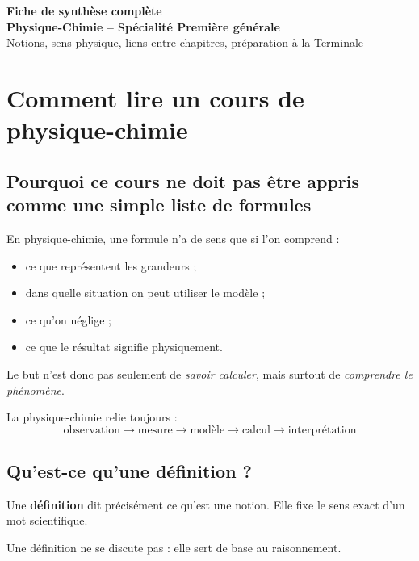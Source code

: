 \documentclass[11pt,a4paper]{article}
\begin{document}
\begin{center}
    {\LARGE \textbf{Fiche de synthèse complète}}\\[0.3em]
    {\Large \textbf{Physique-Chimie -- Spécialité Première générale}}\\[0.5em]
    {\large Notions, sens physique, liens entre chapitres, préparation à la Terminale}
\end{center}

\vspace{0.7em}

\tableofcontents

\newpage

\section{Comment lire un cours de physique-chimie}

\subsection{Pourquoi ce cours ne doit pas être appris comme une simple liste de formules}

En physique-chimie, une formule n'a de sens que si l'on comprend :
\begin{itemize}
    \item ce que représentent les grandeurs ;
    \item dans quelle situation on peut utiliser le modèle ;
    \item ce qu'on néglige ;
    \item ce que le résultat signifie physiquement.
\end{itemize}

Le but n'est donc pas seulement de \emph{savoir calculer}, mais surtout de \emph{comprendre le phénomène}.

\begin{sensbox}
La physique-chimie relie toujours :
\[
\text{observation} \longrightarrow \text{mesure} \longrightarrow \text{modèle} \longrightarrow \text{calcul} \longrightarrow \text{interprétation}
\]
\end{sensbox}

\subsection{Qu'est-ce qu'une définition ?}

\begin{definitionbox}
Une \textbf{définition} dit précisément ce qu'est une notion.  
Elle fixe le sens exact d'un mot scientifique.

Une définition ne se discute pas : elle sert de base au raisonnement.
\end{definitionbox}
\end{document}

